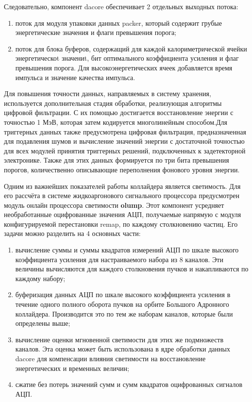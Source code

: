Следовательно, компонент dacore обеспечивает 2 отдельных выходных потока:\par
\begin{enumerate}
    \item поток для модуля упаковки данных packer, который содержит грубые энергетические значения и флаги превышения порога;
    \item поток для блока буферов, содержащий для каждой калориметрической ячейки энергетическоt значениt, бит оптимального коэффициента усиления и флаг превышения порога. Для высокоэнергетических ячеек добавляется время импульса и значение качества импульса.
\end{enumerate}\par
Для повышения точности данных, направляемых в систему хранения, используется дополнительная стадия обработки, реализующая алгоритмы цифровой фильтрации. С их помощью достигается восстановление энергии с точностью 1 МэВ, которая затем кодируется многолинейным способом.Для триггерных данных также предусмотрена цифровая фильтрация, предназначенная для подавления шумов и вычисление значений энергии с достаточной точностью для всех модулей принятия триггерных решений, подключенных к задетекторной электронике. Также для этих данных формируется по три бита превышения порогов, количественно описывающие переполнения фонового уровня энергии.\par
Одним из важнейших показателей работы коллайдера является светимость. Для его рассчёта в системе жидкоаргонового сигнального процессора предусмотрен модуль онлайн процессора светимости \textbf{olump}. Этот компонент усредняет необработанные оцифрованные значения АЦП, получаемые напрямую с модуля конфигурируемой перестановки remap, по каждому столкновению частиц. Его задачи можно разделить на 4 основных части:\par
\begin{enumerate}
    \item вычисление суммы и суммы квадратов измерений АЦП по шкале высокого коэффициента усиления для настраиваемого набора из 8 каналов. Эти величины вычисляются для каждого столкновения пучков и накапливаются по каждому набору;
    \item буферизация данных АЦП по шкале высокого коэффициента усиления в течение одного полного оборота пучков на орбите Большого Адронного коллайдера. Производится это по тем же наборам каналов, которые были определены выше;
    \item вычисление оценки мгновенной светимости для этих же подмножеств каналов. Эта оценка может быть использована в ядре обработки данных dacore для компенсации влияния светимости на восстановление энергетических и временных величин;
    \item сжатие без потерь значений сумм и сумм квадратов оцифрованных сигналов АЦП.
\end{enumerate}\par
